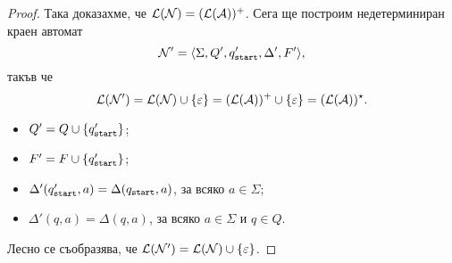 \begin{proof}
  Така доказахме, че $\mathcal{L}(\mathcal{N}) = (\mathcal{L}(\mathcal{A}))^+$.
  Сега ще построим недетерминиран краен автомат
  \[\mathcal{N}' = \langle{\Sigma,Q',q_{\texttt{start}}',\Delta',F'}\rangle,\]
  такъв че
  \[\mathcal{L}(\mathcal{N}') = \mathcal{L}(\mathcal{N})\cup\{\varepsilon\} = (\mathcal{L}(\mathcal{A}))^+ \cup \{\varepsilon\} = (\mathcal{L}(\mathcal{A}))^\star.\]
  \begin{itemize}
  \item
    $Q' = Q \cup \{q_{\texttt{start}}'\}$;
  \item
    $F' = F \cup \{q_{\texttt{start}}'\}$;
  \item
    $\Delta'(q_{\texttt{start}}',a) = \Delta(q_{\texttt{start}},a)$, за всяко $a \in \Sigma$;
  \item
    $\Delta'(q,a) = \Delta(q,a)$, за всяко $a \in \Sigma$ и $q\in Q$.
  \end{itemize}
  Лесно се съобразява, че $\mathcal{L}(\mathcal{N}') = \mathcal{L}(\mathcal{N})\cup\{\varepsilon\}$.
\end{proof}

